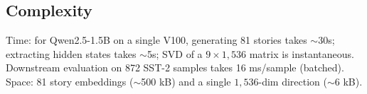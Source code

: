 \subsection{Complexity}

Time: for Qwen2.5-1.5B on a single V100, generating 81 stories takes
$\sim$30s; extracting hidden states takes $\sim$5s; SVD of a
$9\times 1{,}536$ matrix is instantaneous. Downstream evaluation on 872 SST-2
samples takes 16 ms/sample (batched). Space: 81 story embeddings
($\sim$500 kB) and a single $1{,}536$-dim direction ($\sim$6 kB).
